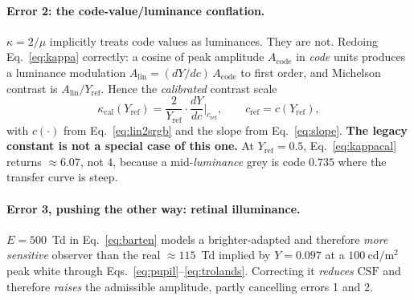\documentclass[11pt,a4paper]{article}
\begin{document}
\paragraph{Error 2: the code-value/luminance conflation.}
$\kappa=2/\mu$ implicitly treats code values as luminances. They are not.
Redoing Eq.~\eqref{eq:kappa} correctly: a cosine of peak amplitude
$A_{\mathrm{code}}$ in \emph{code} units produces a luminance modulation
$A_{\mathrm{lin}} = (dY/dc)\,A_{\mathrm{code}}$ to first order, and
Michelson contrast is $A_{\mathrm{lin}}/Y_{\mathrm{ref}}$. Hence the
\emph{calibrated} contrast scale
\begin{equation}
  \kappa_{\mathrm{cal}}(Y_{\mathrm{ref}})
  = \frac{2}{Y_{\mathrm{ref}}}\cdot
    \frac{dY}{dc}\bigg|_{c_{\mathrm{ref}}},
  \qquad c_{\mathrm{ref}} = c(Y_{\mathrm{ref}}),
  \label{eq:kappacal}
\end{equation}
with $c(\cdot)$ from Eq.~\eqref{eq:lin2srgb} and the slope from
Eq.~\eqref{eq:slope}. \textbf{The legacy constant is not a special case of
this one.} At $Y_{\mathrm{ref}}=0.5$, Eq.~\eqref{eq:kappacal} returns
$\approx6.07$, not $4$, because a mid-\emph{luminance} grey is code $0.735$
where the transfer curve is steep.

\paragraph{Error 3, pushing the other way: retinal illuminance.}
$E=500$~Td in Eq.~\eqref{eq:barten} models a brighter-adapted and therefore
\emph{more sensitive} observer than the real $\approx115$~Td implied by
$Y=0.097$ at a $100\ \mathrm{cd/m^2}$ peak white through
Eqs.~\eqref{eq:pupil}--\eqref{eq:trolands}. Correcting it \emph{reduces}
$\mathrm{CSF}$ and therefore \emph{raises} the admissible amplitude, partly
cancelling errors 1 and 2.
\end{document}
